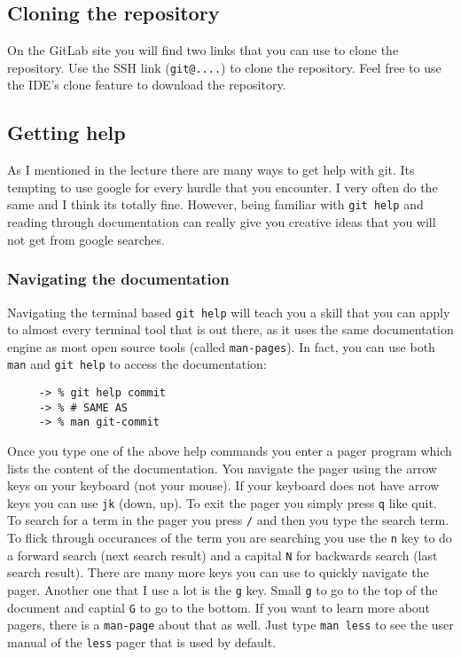 \documentclass[12pt]{article}
\begin{document}
\subsection{Cloning the repository}

On the GitLab site you will find two links that
you can use to clone the repository.
Use the SSH link (\texttt{git@....}) to clone the repository.
Feel free to use the IDE's clone feature to download the repository.


\subsection{Getting help}
As I mentioned in the lecture there are many ways to get help with git.
Its tempting to use google for every hurdle that you encounter.
I very often do the same and I think its totally fine.
However, being familiar with \texttt{git help}
and reading through documentation can really give you creative ideas
that you will not get from google searches.

\subsubsection{Navigating the documentation}
Navigating the terminal based \texttt{git help}
will teach you a skill that you can apply to almost every
terminal tool that is out there,
as it uses the same documentation engine as most open source tools (called \texttt{man-pages}).
In fact, you can use both \texttt{man} and \texttt{git help} to access the documentation:

    \begin{verbatim}
     -> % git help commit
     -> % # SAME AS
     -> % man git-commit
    \end{verbatim}

Once you type one of the above help commands you enter a pager program which
lists the content of the documentation.
You navigate the pager using the arrow keys on your keyboard (not your mouse).
If your keyboard does not have arrow keys you can use \texttt{jk} (down, up).
To exit the pager you simply press \texttt{q} like quit.
To search for a term in the pager you press \texttt{/} and then you type the search term.
To flick through occurances of the term you are searching you use the \texttt{n} key
to do a forward search (next search result)
and a capital \texttt{N} for backwards search (last search result).
There are many more keys you can use to quickly navigate the pager.
Another one that I use a lot is the \texttt{g} key.
Small \texttt{g} to go to the top of the document and
captial \texttt{G} to go to the bottom.
If you want to learn more about pagers,
there is a \texttt{man-page} about that as well.
Just type \texttt{man less} to see the user manual of the \texttt{less} pager
that is used by default.
\end{document}

